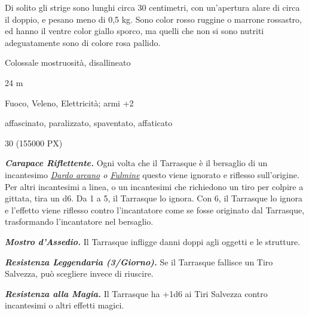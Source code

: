 \begin{multicols}{2}
{Di solito gli strige sono lunghi circa 30 centimetri, con un'apertura alare di circa il doppio, e pesano meno di 0,5 kg. Sono color rosso ruggine o marrone rossastro, ed hanno il ventre color giallo sporco, ma quelli che non si sono nutriti adeguatamente sono di colore rosa pallido.


\begin{description}[noitemsep, topsep=0pt, parsep=0pt, partopsep=0pt, itemsep=1pt, leftmargin=2.35cm,  labelwidth=2.2cm, itemindent=0cm, listparindent=0pt] %
\setlength{\baselineskip}{10pt}
\item[\textbf{Taglia/Tipo}] Colossale mostruosità, disallineato
\item[\textbf{Caratt.}] 
\item[\textbf{Punti Ferita}] 
\item[\textbf{Movimento}] 24 m
\item[\textbf{Tiri Salvez.}] 
\item[\textbf{Imm. Danni}] Fuoco, Veleno, Elettricità; armi +2
\item[\textbf{Immunità}] affascinato, paralizzato, spaventato, affaticato
\item[\textbf{Sensi}] 
\item[\textbf{Sfida}] 30 (155000 PX)
\end{description}
\smallskip

\emph{\textbf{Carapace Riflettente.}} Ogni volta che il Tarrasque è il bersaglio di un incantesimo \emph{\hyperlink{Dardo arcano}{Dardo arcano} o \hyperlink{Fulmine}{Fulmine}} questo viene ignorato e riflesso sull'origine. Per altri incantesimi a linea, o un incantesimi che richiedono un tiro per colpire a gittata, tira un d6. Da 1 a 5, il Tarrasque lo ignora. Con 6, il Tarrasque lo ignora e l'effetto viene riflesso contro l'incantatore come se fosse originato dal Tarrasque, trasformando l'incantatore nel bersaglio.

\emph{\textbf{Mostro d'Assedio.}} Il Tarrasque infligge danni doppi agli oggetti e le strutture.

\emph{\textbf{Resistenza Leggendaria (3/Giorno).}} Se il Tarrasque fallisce un Tiro Salvezza, può scegliere invece di riuscire.

\emph{\textbf{Resistenza alla Magia.}} Il Tarrasque ha +1d6 ai Tiri Salvezza contro incantesimi o altri effetti magici.

}
\end{multicols}
